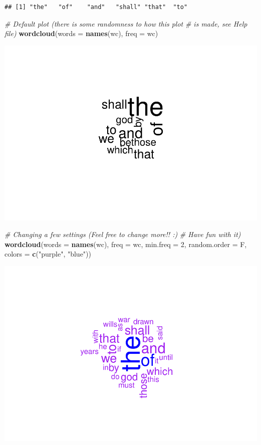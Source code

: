 \documentclass[
]{book}
\newenvironment{Shaded}{\begin{snugshade}}{\end{snugshade}}
\newcommand{\CommentTok}[1]{\textcolor[rgb]{0.56,0.35,0.01}{\textit{#1}}}
\newcommand{\DataTypeTok}[1]{\textcolor[rgb]{0.13,0.29,0.53}{#1}}
\newcommand{\DecValTok}[1]{\textcolor[rgb]{0.00,0.00,0.81}{#1}}
\newcommand{\KeywordTok}[1]{\textcolor[rgb]{0.13,0.29,0.53}{\textbf{#1}}}
\newcommand{\NormalTok}[1]{#1}
\newcommand{\StringTok}[1]{\textcolor[rgb]{0.31,0.60,0.02}{#1}}
\begin{document}
\begin{verbatim}
## [1] "the"   "of"    "and"   "shall" "that"  "to"
\end{verbatim}

\begin{Shaded}
\begin{Highlighting}[]
\CommentTok{# Default plot (there is some randomness to how this plot}
\CommentTok{# is made, see Help file)}
\KeywordTok{wordcloud}\NormalTok{(}\DataTypeTok{words =} \KeywordTok{names}\NormalTok{(wc), }\DataTypeTok{freq =}\NormalTok{ wc)}
\end{Highlighting}
\end{Shaded}

\includegraphics{_main_files/figure-latex/unnamed-chunk-342-1.pdf}

\begin{Shaded}
\begin{Highlighting}[]
\CommentTok{# Changing a few settings (Feel free to change more!! :)}
\CommentTok{# Have fun with it)}
\KeywordTok{wordcloud}\NormalTok{(}\DataTypeTok{words =} \KeywordTok{names}\NormalTok{(wc), }\DataTypeTok{freq =}\NormalTok{ wc, }\DataTypeTok{min.freq =} \DecValTok{2}\NormalTok{, }\DataTypeTok{random.order =}\NormalTok{ F,}
    \DataTypeTok{colors =} \KeywordTok{c}\NormalTok{(}\StringTok{"purple"}\NormalTok{, }\StringTok{"blue"}\NormalTok{))}
\end{Highlighting}
\end{Shaded}

\includegraphics{_main_files/figure-latex/unnamed-chunk-342-2.pdf}
\end{document}
